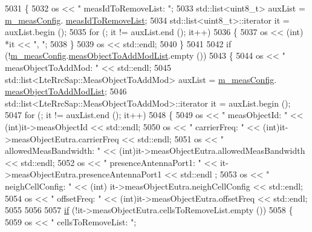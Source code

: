 \begin{DoxyCode}
5031         \{
5032           os << \textcolor{stringliteral}{"  measIdToRemoveList: "};
5033           std::list<uint8\_t> auxList = \hyperlink{classns3_1_1RrcConnectionReconfigurationHeader_a5fd4a46dd4c2fdefd5fdaa4d6f51a198}{m\_measConfig}.
      \hyperlink{structns3_1_1LteRrcSap_1_1MeasConfig_a05e09722746ecc1c9dd41a06d4f48e0e}{measIdToRemoveList};
5034           std::list<uint8\_t>::iterator it = auxList.begin ();
5035           \textcolor{keywordflow}{for} (; it != auxList.end (); it++)
5036             \{
5037               os << (int) *it << \textcolor{stringliteral}{", "};
5038             \}
5039           os << std::endl;
5040         \}
5041 
5042       \textcolor{keywordflow}{if} (!\hyperlink{classns3_1_1RrcConnectionReconfigurationHeader_a5fd4a46dd4c2fdefd5fdaa4d6f51a198}{m\_measConfig}.\hyperlink{structns3_1_1LteRrcSap_1_1MeasConfig_a1e32e45b55111bddfdc608cbff780dc2}{measObjectToAddModList}.empty ())
5043         \{
5044           os << \textcolor{stringliteral}{"  measObjectToAddMod: "} << std::endl;
5045           std::list<LteRrcSap::MeasObjectToAddMod> auxList = \hyperlink{classns3_1_1RrcConnectionReconfigurationHeader_a5fd4a46dd4c2fdefd5fdaa4d6f51a198}{m\_measConfig}.
      \hyperlink{structns3_1_1LteRrcSap_1_1MeasConfig_a1e32e45b55111bddfdc608cbff780dc2}{measObjectToAddModList};
5046           std::list<LteRrcSap::MeasObjectToAddMod>::iterator it = auxList.begin ();
5047           \textcolor{keywordflow}{for} (; it != auxList.end (); it++)
5048             \{
5049               os << \textcolor{stringliteral}{"    measObjectId: "} << (int)it->measObjectId << std::endl;
5050               os << \textcolor{stringliteral}{"    carrierFreq: "} << (\textcolor{keywordtype}{int})it->measObjectEutra.carrierFreq << std::endl;
5051               os << \textcolor{stringliteral}{"    allowedMeasBandwidth: "} <<  (int)it->measObjectEutra.allowedMeasBandwidth << 
      std::endl;
5052               os << \textcolor{stringliteral}{"    presenceAntennaPort1: "} <<  it->measObjectEutra.presenceAntennaPort1  << std::endl
      ;
5053               os << \textcolor{stringliteral}{"    neighCellConfig: "} << (\textcolor{keywordtype}{int}) it->measObjectEutra.neighCellConfig  << std::endl;
5054               os << \textcolor{stringliteral}{"    offsetFreq: "} <<  (int)it->measObjectEutra.offsetFreq  << std::endl;
5055 
5056 
5057               \hyperlink{loss__ITU1238_8m_a419d895abe1313c35fa353c93802647e}{if} (!it->measObjectEutra.cellsToRemoveList.empty ())
5058                 \{
5059                   os << \textcolor{stringliteral}{"    cellsToRemoveList: "};

\end{DoxyCode}
